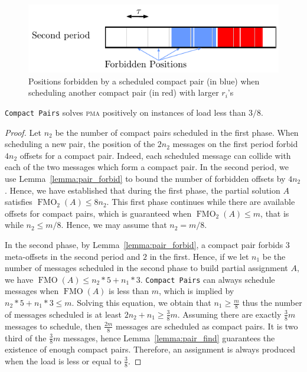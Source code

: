 \documentclass[a4paper,UKenglish,cleveref, autoref, thm-restate]{lipics-v2019}
\DeclareMathOperator{\Fmo}{FMO}
\newcommand\pma{\textsc{pma}\xspace}
\newcommand\compactpair{\texttt{Compact Pairs}\xspace}
\begin{document}
\begin{figure}
\begin{center}
\includegraphics[scale=0.7]{pairforbiden}
\end{center}

\caption{Positions forbidden by a scheduled compact pair (in blue) when scheduling another compact pair (in red) with larger $r_i$'s} 
\label{fig:forbidenmeta}
\end{figure}
\begin{theorem}
\compactpair solves \pma positively on instances of load less than $3/8$.
\end{theorem}
\begin{proof}
Let $n_2$ be the number of compact pairs scheduled in the first phase. When scheduling a new pair, the position of the $2n_2$ messages on the first period forbid $4n_2$ offsets for a compact pair. Indeed, each scheduled message can collide with each of the two messages which form a compact pair. In the second period, we use Lemma~\ref{lemma:pair_forbid} to bound the number of forbidden offsets by $4n_2$. 
Hence, we have established that during the first phase, the partial solution $A$ satisfies $\Fmo_2(A) \leq 8n_2$. This first phase continues while there are available offsets for compact pairs, which is guaranteed when $\Fmo_2(A) \leq m$, that is while $n_2 \leq m/8$. Hence, we may assume that $n_2 = m/8$.

In the second phase, by Lemma~\ref{lemma:pair_forbid}, a compact pair forbids $3$ meta-offsets in the 
second period and $2$ in the first. Hence, if we let $n_1$ be the number of messages scheduled in the second phase to build partial assignment $A$, we have $\Fmo(A) \leq n_2*5 + n_1*3$. 
\compactpair can always schedule messages when $\Fmo(A)$ is less than $m$, which is implied by $n_2*5 + n_1*3 \leq m$.
Solving this equation, we obtain that $n_1 \geq \frac{m}{8}$ thus the number of messages scheduled is at least $2n_2 + n_1 \geq \frac{3}{8}m$. Assuming there are exactly $\frac{3}{8}m$ messages to schedule, then $\frac{2m}{8}$ messages are scheduled as compact pairs. It is two third of the $\frac{3}{8}m$ messages, hence Lemma~\ref{lemma:pair_find} guarantees the existence of enough compact pairs. Therefore, an assignment is always produced when the load is less or equal to $\frac{3}{8}$.
\end{proof}
\end{document}
